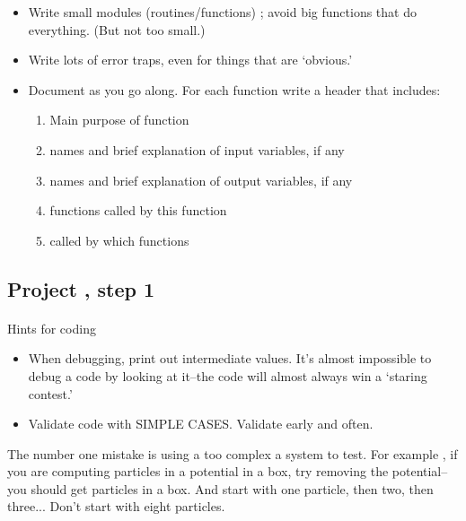 \documentclass[%
twoside,                 %
final,                   %
10pt]{article}
\begin{document}
\begin{itemize}
\item Write small modules (routines/functions) ; avoid big functions  that do everything. (But not too small.)

\item Write lots of error traps, even for things that are `obvious.'

\item Document as you go along.  For each function write a header that includes: 
\begin{enumerate}

\item Main purpose of function

\item names and  brief explanation of input variables, if any 

\item names and brief explanation of output variables, if any

\item functions called by this function

\item called by which functions
\end{enumerate}

\noindent
\end{itemize}

\noindent



\subsection*{Project , step 1}

\paragraph{}

Hints for coding

\begin{itemize}
\item When debugging, print out intermediate values. It's almost impossible to debug a  code by looking at it--the code will almost always win a `staring contest.'

\item Validate code with SIMPLE CASES. Validate early and often.   
\end{itemize}

\noindent
The number one mistake is using a too complex a system to test. For example ,
if you are computing particles in a potential in a box, try removing the potential--you should get 
particles in a box. And start with one particle, then two, then three... Don't start with 
eight particles.
\end{document}
